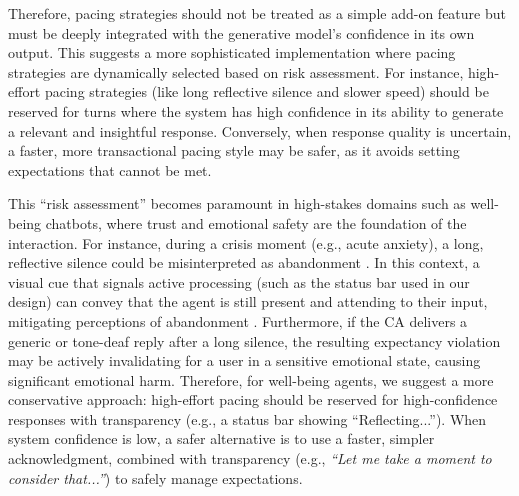 Therefore, pacing strategies should not be treated as a simple add-on feature but must be deeply integrated with the generative model's confidence in its own output. This suggests a more sophisticated implementation where pacing strategies are dynamically selected based on risk assessment. For instance, high-effort pacing strategies (like long reflective silence and slower speed) should be reserved for turns where the system has high confidence in its ability to generate a relevant and insightful response. Conversely, when response quality is uncertain, a faster, more transactional pacing style may be safer, as it avoids setting expectations that cannot be met.

This ``risk assessment'' becomes paramount in high-stakes domains such as well-being chatbots, where trust and emotional safety are the foundation of the interaction. For instance, during a crisis moment (e.g., acute anxiety), a long, reflective silence could be misinterpreted as abandonment \cite{Miner2016SmartphoneBased}. In this context, a visual cue that signals active processing (such as the status bar used in our design) can convey that the agent is still present and attending to their input, mitigating perceptions of abandonment \cite{Adam2020AI-based}. Furthermore, if the CA delivers a generic or tone-deaf reply after a long silence, the resulting expectancy violation may be actively invalidating for a user in a sensitive emotional state, causing significant emotional harm. Therefore, for well-being agents, we suggest a more conservative approach: high-effort pacing should be reserved for high-confidence responses with transparency (e.g., a status bar showing ``Reflecting...''). When system confidence is low, a safer alternative is to use a faster, simpler acknowledgment, combined with transparency (e.g., \textit{``Let me take a moment to consider that...''}) to safely manage expectations.

